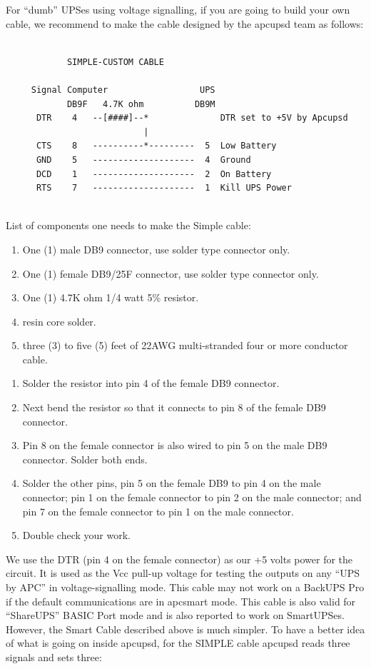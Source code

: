 {{{{{{{{{{For ``dumb'' UPSes using voltage signalling, if you are going to build your
own cable, we recommend to make the cable designed by the apcupsd team as
follows: 

\footnotesize
\begin{verbatim}
     
            SIMPLE-CUSTOM CABLE
     
     Signal Computer                  UPS
            DB9F   4.7K ohm          DB9M
      DTR    4   --[####]--*              DTR set to +5V by Apcupsd
                           |
      CTS    8   ----------*---------  5  Low Battery
      GND    5   --------------------  4  Ground
      DCD    1   --------------------  2  On Battery
      RTS    7   --------------------  1  Kill UPS Power
     
\end{verbatim}
\normalsize

List of components one needs to make the Simple cable:  

\begin{enumerate}
\item One (1) male DB9 connector, use solder type connector only.  
\item One (1) female DB9/25F connector, use solder type connector only.  
\item One (1) 4.7K ohm 1/4 watt 5\% resistor.  
\item resin core solder.  
\item three (3) to five (5) feet of 22AWG multi-stranded four or more
conductor cable.  
\end{enumerate}

\begin{enumerate}
\item Solder the resistor into pin 4 of the female DB9 connector.  
\item Next bend the resistor so that it connects to pin 8 of the female DB9
connector.  
\item Pin 8 on the female connector is also wired to pin 5 on the male DB9
connector. Solder both ends.  
\item Solder the other pins, pin 5 on the female DB9 to pin 4 on the male
connector; pin 1 on the female connector to pin 2 on the male connector; and
pin 7 on the female connector to pin 1 on the male connector.  
\item Double check your work.  
\end{enumerate}

We use the DTR (pin 4 on the female connector) as our +5 volts power for the
circuit. It is used as the Vcc pull-up voltage for testing the outputs on any
``UPS by APC'' in voltage-signalling mode.  This cable may not work on a
BackUPS Pro if the default communications are in apcsmart mode. This cable is
also valid for ``ShareUPS'' BASIC Port mode and is also reported to work on
SmartUPSes. However, the Smart Cable described above is much simpler. To have
a better idea of what is going on inside apcupsd, for the SIMPLE cable apcupsd
reads three signals and sets three: 

}}}}}}}}}}
